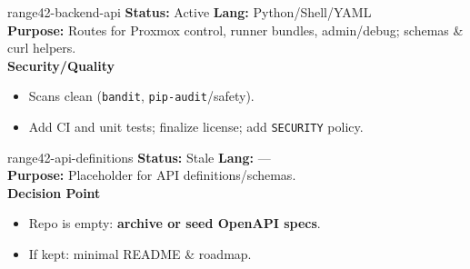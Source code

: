 \documentclass[aspectratio=169]{beamer}
\begin{document}
\begin{frame}{range42-backend-api \; \faProjectDiagram}
  \textbf{Status:} Active \hfill \textbf{Lang:} Python/Shell/YAML\\[2mm]
  \textbf{Purpose:} Routes for Proxmox control, runner bundles, admin/debug; schemas \& curl helpers.\\[2mm]
  \textbf{Security/Quality}
  \begin{itemize}
    \item Scans clean (\texttt{bandit}, \texttt{pip-audit}/safety).
    \item \alert{Add CI and unit tests}; finalize license; add \texttt{SECURITY} policy.
  \end{itemize}
\end{frame}

\begin{frame}{range42-api-definitions \; \faSitemap}
  \textbf{Status:} Stale \hfill \textbf{Lang:} —\\[2mm]
  \textbf{Purpose:} Placeholder for API definitions/schemas.\\[2mm]
  \textbf{Decision Point}
  \begin{itemize}
    \item Repo is empty: \textbf{archive or seed OpenAPI specs}.
    \item If kept: minimal README \& roadmap.
  \end{itemize}
\end{frame}


\end{document}
